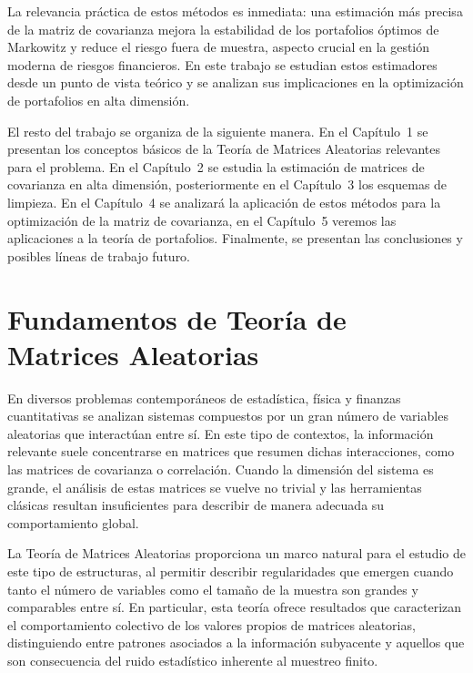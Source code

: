 \documentclass[letterpaper,12pt,oneside]{book}
\begin{document}
La relevancia práctica de estos métodos es inmediata: una estimación más precisa de la matriz de covarianza mejora la estabilidad de los portafolios óptimos de Markowitz y reduce el riesgo fuera de muestra, aspecto crucial en la gestión moderna de riesgos financieros. En este trabajo se estudian estos estimadores desde un punto de vista teórico y se analizan sus implicaciones en la optimización de portafolios en alta dimensión.

El resto del trabajo se organiza de la siguiente manera. En el Capítulo~1 se presentan los conceptos básicos de la Teoría de Matrices Aleatorias relevantes para el problema. En el Capítulo~2 se estudia la estimación de matrices de covarianza en alta dimensión, posteriormente en el Capítulo~3 los esquemas de limpieza. En el Capítulo~4 se analizará la aplicación de estos métodos para la optimización de la matriz de covarianza, en el Capítulo~5 veremos las aplicaciones a la teoría de portafolios. Finalmente, se presentan las conclusiones y posibles líneas de trabajo futuro.

\cleardoublepage
{}
\tableofcontents
    
\mainmatter

\chapter{Fundamentos de Teoría de Matrices Aleatorias}
En diversos problemas contemporáneos de estadística, física y finanzas cuantitativas se analizan sistemas compuestos por un gran número de variables aleatorias que interactúan entre sí. En este tipo de contextos, la información relevante suele concentrarse en matrices que resumen dichas interacciones, como las matrices de covarianza o correlación. Cuando la dimensión del sistema es grande, el análisis de estas matrices se vuelve no trivial y las herramientas clásicas resultan
insuficientes para describir de manera adecuada su comportamiento global.

La Teoría de Matrices Aleatorias proporciona un marco natural para el estudio de este tipo de estructuras, al permitir describir regularidades que emergen cuando tanto el número de variables como el tamaño de la muestra son grandes y comparables entre sí. En particular, esta teoría
ofrece resultados que caracterizan el comportamiento colectivo de los valores propios de matrices aleatorias, distinguiendo entre patrones asociados a la información subyacente y aquellos que son consecuencia del ruido estadístico inherente al muestreo finito.
\end{document}
